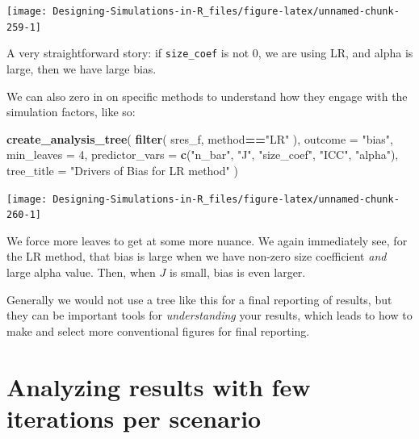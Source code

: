\documentclass[
]{book}
\newenvironment{Shaded}{\begin{snugshade}}{\end{snugshade}}
\newcommand{\AttributeTok}[1]{\textcolor[rgb]{0.13,0.29,0.53}{#1}}
\newcommand{\DecValTok}[1]{\textcolor[rgb]{0.00,0.00,0.81}{#1}}
\newcommand{\FunctionTok}[1]{\textcolor[rgb]{0.13,0.29,0.53}{\textbf{#1}}}
\newcommand{\NormalTok}[1]{#1}
\newcommand{\SpecialCharTok}[1]{\textcolor[rgb]{0.81,0.36,0.00}{\textbf{#1}}}
\newcommand{\StringTok}[1]{\textcolor[rgb]{0.31,0.60,0.02}{#1}}
\begin{document}
\begin{center}\texttt{[image: Designing-Simulations-in-R\_files/figure-latex/unnamed-chunk-259-1]} \end{center}

A very straightforward story: if \texttt{size\_coef} is not 0, we are using LR, and alpha is large, then we have large bias.

We can also zero in on specific methods to understand how they engage with the simulation factors, like so:

\begin{Shaded}
\begin{Highlighting}[]
\FunctionTok{create\_analysis\_tree}\NormalTok{( }\FunctionTok{filter}\NormalTok{( sres\_f, method}\SpecialCharTok{==}\StringTok{"LR"}\NormalTok{ ),}
                      \AttributeTok{outcome =} \StringTok{"bias"}\NormalTok{,}
                      \AttributeTok{min\_leaves =} \DecValTok{4}\NormalTok{,}
                      \AttributeTok{predictor\_vars =} \FunctionTok{c}\NormalTok{(}\StringTok{"n\_bar"}\NormalTok{, }\StringTok{"J"}\NormalTok{,}
                                         \StringTok{"size\_coef"}\NormalTok{, }\StringTok{"ICC"}\NormalTok{, }\StringTok{"alpha"}\NormalTok{),}
                      \AttributeTok{tree\_title =} \StringTok{"Drivers of Bias for LR method"}\NormalTok{ )}
\end{Highlighting}
\end{Shaded}

\begin{center}\texttt{[image: Designing-Simulations-in-R\_files/figure-latex/unnamed-chunk-260-1]} \end{center}

We force more leaves to get at some more nuance.
We again immediately see, for the LR method, that bias is large when we have non-zero size coefficient \emph{and} large alpha value.
Then, when \(J\) is small, bias is even larger.

Generally we would not use a tree like this for a final reporting of results, but they can be important tools for \emph{understanding} your results, which leads to how to make and select more conventional figures for final reporting.

\section{Analyzing results with few iterations per scenario}\label{analyzing-results-with-few-iterations-per-scenario}
\end{document}
